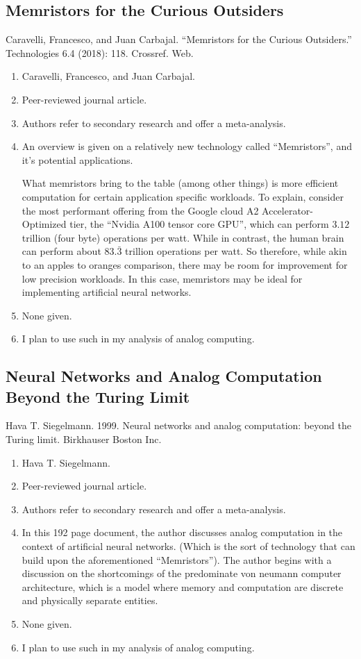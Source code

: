 \subsection*{Memristors for the Curious Outsiders}
Caravelli, Francesco, and Juan Carbajal. “Memristors for the Curious Outsiders.” Technologies 6.4 (2018): 118. Crossref. Web.
\begin{enumerate}
    \item Caravelli, Francesco, and Juan Carbajal.
    \item Peer-reviewed journal article.
    \item Authors refer to secondary research and offer a meta-analysis.
    \item An overview is given on a relatively new technology called ``Memristors'', and it's potential applications.
    
    What memristors bring to the table (among other things) is more efficient computation for certain application specific workloads. To explain, consider the most performant offering from the Google cloud A2 Accelerator-Optimized tier, the ``Nvidia A100 tensor core GPU'', which can perform $3.12$ trillion (four byte) operations per watt. While in contrast, the human brain can perform about $83.\bar{3}$ trillion operations per watt. So therefore, while akin to an apples to oranges comparison, there may be room for improvement for low precision workloads. In this case, memristors may be ideal for implementing artificial neural networks.
        \item None given. 
    \item I plan to use such in my analysis of analog computing. 
\end{enumerate}



\subsection*{Neural Networks and Analog Computation Beyond the Turing Limit}
Hava T. Siegelmann. 1999. Neural networks and analog computation: beyond the Turing limit. Birkhauser Boston Inc.
\begin{enumerate}
    \item Hava T. Siegelmann.
    \item Peer-reviewed journal article.
    \item Authors refer to secondary research and offer a meta-analysis.
    \item In this 192 page document, the author discusses analog computation in the context of artificial neural networks. (Which is the sort of technology that can build upon the aforementioned ``Memristors''). The author begins with a discussion on the shortcomings of the predominate von neumann computer architecture, which is a model where memory and computation are discrete and physically separate entities. 
    \item None given. 
    \item I plan to use such in my analysis of analog computing. 
\end{enumerate}


